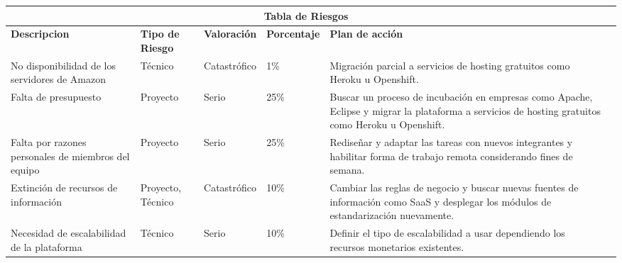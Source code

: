     \begin{table}[h]
    \centering
      \begin{tabular}{|p{3cm}|lllll}
        \hline
        \multicolumn{5}{|c|}{{\bf Tabla de Riesgos}} \\ 
        \hline
          \multicolumn{1}{|p{3cm}|}{{\bf Descripcion}} & 
          \multicolumn{1}{p{2cm}|}{{\bf Tipo de Riesgo}} & 
          \multicolumn{1}{p{2cm}|}{{\bf Valoración}} & 
          \multicolumn{1}{p{2cm}|}{{\bf Porcentaje}} & 
          \multicolumn{1}{p{5cm}|}{{\bf Plan de acción}} \\ 
        \hline
          \multicolumn{1}{|p{3cm}|}{No disponibilidad de los servidores de Amazon} & 
          \multicolumn{1}{p{2cm}|}{Técnico} & 
          \multicolumn{1}{p{2cm}|}{Catastrófico} & 
          \multicolumn{1}{p{2cm}|}{1\%} & 
          \multicolumn{1}{p{5cm}|}{Migración parcial a servicios de hosting gratuitos como Heroku u Openshift.} \\ 
        \hline
          \multicolumn{1}{|p{3cm}|}{Falta de presupuesto} & 
          \multicolumn{1}{p{2cm}|}{Proyecto} & 
          \multicolumn{1}{p{2cm}|}{Serio} & 
          \multicolumn{1}{p{2cm}|}{25\%} & 
          \multicolumn{1}{p{5cm}|}{Buscar un proceso de incubación en empresas como Apache, Eclipse y migrar la plataforma a servicios de hosting gratuitos como Heroku u Openshift.} \\ 
        \hline
          \multicolumn{1}{|p{3cm}|}{Falta por razones personales de miembros del equipo} & 
          \multicolumn{1}{p{2cm}|}{Proyecto} &
          \multicolumn{1}{p{2cm}|}{Serio} & 
          \multicolumn{1}{p{2cm}|}{25\%} & 
          \multicolumn{1}{p{5cm}|}{Rediseñar y adaptar las tareas con nuevos integrantes y habilitar forma de trabajo remota considerando fines de semana.} \\ 
        \hline
          \multicolumn{1}{|p{3cm}|}{Extinción de recursos de información} & 
          \multicolumn{1}{p{2cm}|}{Proyecto, Técnico} & 
          \multicolumn{1}{p{2cm}|}{Catastrófico} & 
          \multicolumn{1}{p{2cm}|}{10\%} & 
          \multicolumn{1}{p{5cm}|}{Cambiar las reglas de negocio y buscar nuevas fuentes de información como SaaS y desplegar los módulos de estandarización nuevamente.} \\ 
        \hline
          \multicolumn{1}{|p{3cm}|}{Necesidad de escalabilidad de la plataforma} & 
          \multicolumn{1}{p{2cm}|}{Técnico} & 
          \multicolumn{1}{p{2cm}|}{Serio} & 
          \multicolumn{1}{p{2cm}|}{10\%} & 
          \multicolumn{1}{p{5cm}|}{Definir el tipo de escalabilidad a usar dependiendo los recursos monetarios existentes.} \\ 

\end{tabular}
\end{table}
